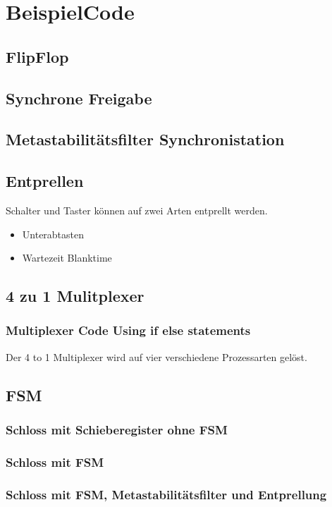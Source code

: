\section{BeispielCode}
\subsection{FlipFlop}


\subsection{Synchrone Freigabe}


\subsection{Metastabilitätsfilter Synchronistation}


\subsection{Entprellen}
Schalter und Taster können auf zwei Arten entprellt werden.\\
\begin{itemize}
\item Unterabtasten
\item Wartezeit Blanktime
\end{itemize}


\subsection{4 zu 1 Mulitplexer}

\subsubsection{Multiplexer Code Using if else statements}
Der 4 to 1 Multiplexer wird auf vier verschiedene Prozessarten gelöst.


\subsection{FSM}

\subsubsection{Schloss mit Schieberegister ohne FSM}


\subsubsection{Schloss mit FSM}


\subsubsection{Schloss mit FSM, Metastabilitätsfilter und Entprellung}

